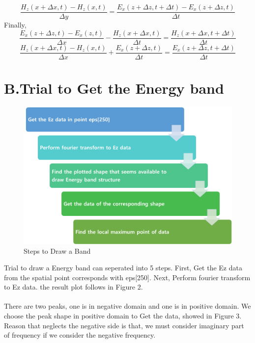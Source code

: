 \documentclass{article}
\begin{document}
\begin{equation}
    \frac{H_z(x+\Delta x,t)-H_z(x,t)}{\Delta y} =  \frac{E_x(z+\Delta z , t + \Delta t)-E_x(z+\Delta z, t)}{\Delta t}
\end{equation}
Finally,
\begin{equation}
    \frac{E_x(z+\Delta z,t)-E_x(z,t)}{\Delta x} - \frac{H_z(x+\Delta x, t)}{\Delta t} =  \frac{H_z(x+\Delta x , t + \Delta t)}{\Delta t}
\end{equation}
\begin{equation}
    \frac{H_z(x+\Delta x,t)-H_z(x,t)}{\Delta x} + \frac{E_x(z+\Delta z, t)}{\Delta t}  = \frac{E_x(z+\Delta z , t + \Delta t)}{\Delta t}
\end{equation}
\section*{B.Trial to Get the Energy band}
\begin{figure}[h]
    \centerline{\includegraphics[width=\columnwidth]{20230618.png}}
    \caption{Steps to Draw a Band}
    \label{figure_1} 
\end{figure}
Trial to draw a Energy band can seperated into 5 steps. First, Get the Ez data from the spatial point
corresponds with eps[250]. Next, Perform fourier transform to Ez data. the result plot follows in Figure 2.\\ \\
 There are two peaks, one is in negative domain and one is in positive domain. We choose the peak shape in positive domain to Get the data, showed in Figure 3.
Reason that neglects the negative side is that, we must consider imaginary part of frequency if we consider the negative frequency.
\\
\end{document}
